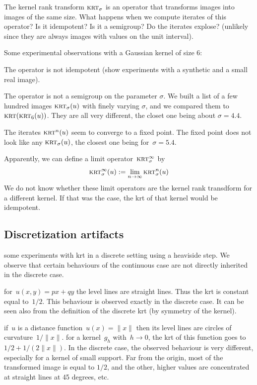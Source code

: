 \documentclass[12pt]{article}                  %
\begin{document}
The kernel rank transform $\textsc{krt}_\sigma$ is an operator that transforms images into images of the same size.
What happens when we compute iterates of this operator?   Is it idempotent?  Is it a semigroup?  Do the iterates explose? (unlikely since they are always images with values on the unit interval).

Some experimental observations with a Gaussian kernel of size
6:

The operator is not idempotent (show experiments with a synthetic and a small real image).

The operator is not a semigroup on the parameter $\sigma$.  We built a list
of a few hundred images $\textsc{krt}_\sigma(u)$ with finely varying
$\sigma$, and we compared them to $\textsc{krt}(\textsc{krt}_6(u))$.  They are all very different, the closet one being about $\sigma=4.4$.

The iterates $\textsc{krt}^n(u)$ seem to converge to a fixed point.  The
fixed point does not look like any $\textsc{krt}_\sigma(u)$, the closest one being for~$\sigma=5.4$.

Apparently, we can define a limit operator~$\textsc{krt}^\infty_\sigma$ by
\[
	\textsc{krt}^\infty_\sigma(u) := \lim_{n\to\infty}\textsc{krt}^n_\sigma(u)
\]
We do not know whether these limit operators are the kernel rank transdform
for a different kernel.   If that was the case, the krt of that kernel
would be idempotent.

\subsection{Discretization artifacts}

some experiments with krt in a discrete setting using a heaviside step.
We observe that certain behaviours of the continuous case are not directly
inherited in the discrete case.

for~$u(x,y)=px+qy$ the level lines are straight lines.  Thus the krt is
constant equal to~$1/2$.  This behaviour is observed exactly in the discrete
case.  It can be seen also from the definition of the discrete krt (by
symmetry of the kernel).

if~$u$ is a distance function~$u(x)=\|x\|$ then its level lines are circles
of curvature~$1/\|x\|$.  for a kernel~$g_h$ with~$h\to 0$, the krt of this
function goes to~$1/2+1/(2\|x\|)$.  In the discrete case, the observed
behaviour is very different, especially for a kernel of small support.  Far
from the origin, most of the transformed image is equal to $1/2$, and the
other, higher values are concentrated at straight lines at 45 degrees, etc.
\end{document}
